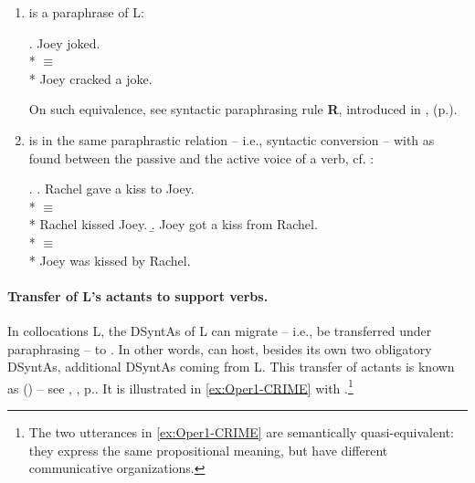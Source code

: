 \begin{enumerate}

\item {}\thinspace{}\thinspace{} is a paraphrase of L:
            
\begingroup
\small

\ex. Joey joked.\\*
     $\equiv$ \\*
     Joey cracked a joke.

\endgroup

On such equivalence, see syntactic paraphrasing rule \textbf{R}, introduced in ,  (p.\thinspace\pageref{txt:RParaphOper1}).

\item {} is in the same paraphrastic relation -- i.e., syntactic conversion -- with  as found between the passive and the active voice of a verb, cf. \Next[a--b]:

\begingroup
\small

\ex. \a. Rachel gave a kiss to Joey.\\*
         $\equiv$ \\*
         Rachel kissed Joey.\vspace{2pt}
     \b. Joey got a kiss from Rachel.\\*
         $\equiv$ \\*
         Joey was kissed by Rachel.

\endgroup

\end{enumerate}

\paragraph*{Transfer of L's actants to support verbs.}\label{par:transferOfLsActants}

In collocations \thinspace{}\thinspace{}L, the DSyntAs of L can migrate -- i.e., be transferred under paraphrasing -- to . In other words,  can host, besides its own two obligatory DSyntAs, additional \mbox{DSyntAs} coming from L. This transfer of actants is known as ()  -- see , , p.\thinspace\pageref{def:DSyntA}. It is illustrated in \ref{ex:Oper1-CRIME} with .\footnote{The two utterances in \ref{ex:Oper1-CRIME} are semantically quasi-equivalent: they express the same propositional meaning, but have different communicative organizations.}

